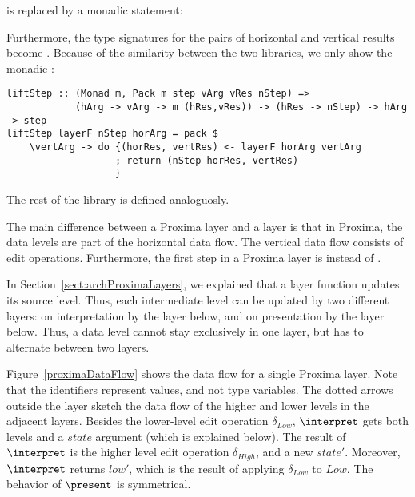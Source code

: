 
is replaced by a monadic statement:


Furthermore, the type signatures for the pairs of horizontal and vertical results  become . Because of the similarity between the two libraries, we only show the monadic :

\begin{small}
\begin{verbatim}
liftStep :: (Monad m, Pack m step vArg vRes nStep) => 
            (hArg -> vArg -> m (hRes,vRes)) -> (hRes -> nStep) -> hArg -> step
liftStep layerF nStep horArg = pack $ 
    \vertArg -> do {(horRes, vertRes) <- layerF horArg vertArg
                   ; return (nStep horRes, vertRes)
                   }
\end{verbatim}
\end{small}

The rest of the library is defined analoguosly.


The main difference between a Proxima layer and a  layer is that in Proxima, the data levels are part of the horizontal data flow. The vertical data flow consists of edit operations. Furthermore, the first step in a Proxima layer is  instead of .

In Section~\ref{sect:archProximaLayers}, we explained that a layer function updates its source level. Thus, each intermediate level can be updated by two different layers: on interpretation by the layer below, and on presentation by the layer below. Thus, a data level cannot stay exclusively in one layer, but has to alternate between two layers.

Figure~\ref{proximaDataFlow} shows the data flow for a single Proxima layer. Note that the identifiers represent values, and not type variables. The dotted arrows outside the layer sketch the data flow of the higher and lower levels in the adjacent layers. Besides the lower-level edit operation $\delta_{Low}$, $\interpret$ gets both levels and a $state$ argument (which is explained below). The result of $\interpret$ is the higher level edit operation $\delta_{High}$, and a new $state'$. Moreover, $\interpret$ returns $low'$, which is the result of applying $\delta_{Low}$ to $Low$. The behavior of $\present$ is symmetrical.

